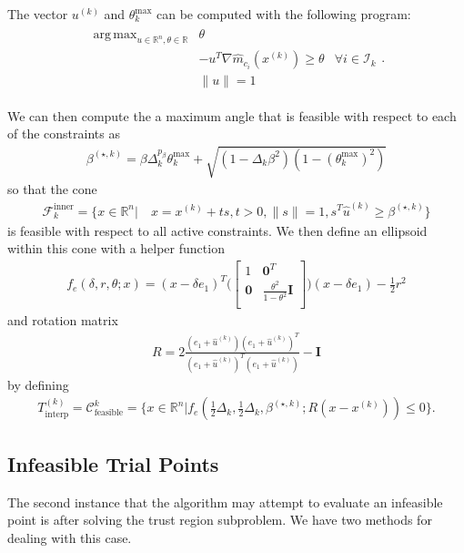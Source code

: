 \documentclass{article}
\theoremstyle{case}
\newcommand{\xk}{{x^{(k)}}}
\newcommand{\Rn}{\mathbb R^n}
\newcommand{\reals}{\mathbb R}
\newcommand{\dk}{\Delta_k}
\newcommand{\sampletrk}{{T_{\text{interp}}^{(k)}}}
\newcommand{\uk}{{u^{(k)}}}
\DeclareMathOperator*{\argmax}{arg\,max}
\newcommand{\unshiftedcone}{{\mathcal C^k_{\text{feasible}}}}
\newcommand{\iik}{{\mathcal I_{k}}}
\newcommand{\huk}{{{\hat u}^{(k)}}}
\newcommand{\bsk}{{\beta^{(\star, k)}}}
\newcommand{\fcki}{{\mathcal {F}^{\text{inner}}_k}}
\newcommand{\rn}{{\mathbb R^{n}}}
\newcommand{\hgmcik}{{\nabla \hat m_{c_i}(\xk)}}
\begin{document}
The vector $\uk$ and $\theta^{\text{max}}_k$ can be computed with the following program:
\begin{align*}
\begin{array}{ccc}
\argmax_{u\in\Rn, \theta\in\reals} & \theta \\
& -u^T \hgmcik \ge \theta & \forall i \in \iik\\
& \|u \| = 1& 
\end{array}.
\end{align*}

We can then compute the a maximum angle that is feasible with respect to each of the constraints as
\begin{align}
\bsk = \beta\dk^{p_{\beta}} \theta^{\text{max}}_k + \sqrt{(1 - \dk\beta^2)\left(1 - (\theta^{\text{max}}_k) ^2\right)} \label{def_bs_k}
\end{align}
so that the cone
\begin{align}
\fcki = \{x \in \rn | \quad x = \xk + ts, t > 0, \|s\| = 1, s^T\huk \ge \bsk \} \label{feasible_cone}
\end{align}
is feasible with respect to all active constraints.
We then define an ellipsoid within this cone with a helper function
\begin{align}
f_e(\delta, r, \theta; x) = (x - \delta e_1)^T\bigg(\begin{bmatrix}
1 & \boldsymbol0^T \\
\boldsymbol 0 & \frac{\theta^2}{1 - \theta^2} \boldsymbol I \\
\end{bmatrix}\bigg)(x - \delta e_1) - \frac 1 2 r^2 \label{def_ellipse_function}
\end{align}
and rotation matrix
\begin{align}
R = 2\frac{(e_1 + \huk)(e_1 + \huk)^T}{(e_1 + \huk)^T(e_1 + \huk)} - \boldsymbol I \label{def_rotation}
\end{align}
by defining
\begin{align}
\sampletrk = \unshiftedcone = \{x \in \rn | f_e\left(\frac 1 2 \dk, \frac 1 2 \dk, \bsk; R(x - \xk)\right) \le 0\}. \label{def_ellipse_k}
\end{align}

\subsection{Infeasible Trial Points}
\label{convex_model_reduction}

The second instance that the algorithm may attempt to evaluate an infeasible point is after solving the trust region subproblem.
We have two methods for dealing with this case.
\end{document}
